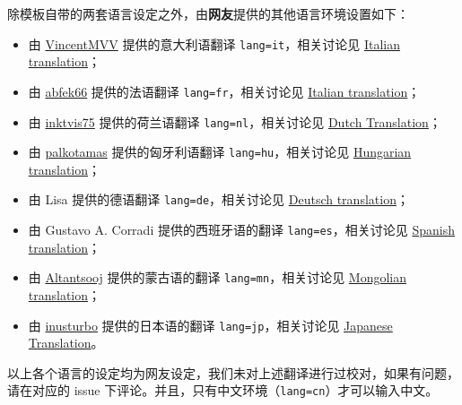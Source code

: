 \documentclass[lang=cn,10pt,cite=super]{elegantbook}
\begin{document}
除模板自带的两套语言设定之外，由\textbf{网友}提供的其他语言环境设置如下：
\begin{itemize}
  \item 由 \href{https://github.com/VincentMVV}{VincentMVV} 提供的意大利语翻译 \lstinline{lang=it}，相关讨论见 \href{https://github.com/ElegantLaTeX/ElegantBook/issues/85}{Italian translation}；
  \item 由 \href{https://github.com/abfek66}{abfek66} 提供的法语翻译 \lstinline{lang=fr}，相关讨论见 \href{https://github.com/ElegantLaTeX/ElegantBook/issues/85}{Italian translation}；
  \item 由 \href{https://github.com/inktvis75}{inktvis75} 提供的荷兰语翻译 \lstinline{lang=nl}，相关讨论见 \href{https://github.com/ElegantLaTeX/ElegantBook/issues/108}{Dutch Translation}；
  \item 由 \href{https://github.com/palkotamas}{palkotamas} 提供的匈牙利语翻译 \lstinline{lang=hu}，相关讨论见 \href{https://github.com/ElegantLaTeX/ElegantBook/issues/111}{Hungarian translation}；
  \item 由 Lisa 提供的德语翻译 \lstinline{lang=de}，相关讨论见 \href{https://github.com/ElegantLaTeX/ElegantBook/issues/113}{Deutsch translation}；
  \item 由 Gustavo A. Corradi 提供的西班牙语的翻译 \lstinline{lang=es}，相关讨论见 \href{https://github.com/ElegantLaTeX/ElegantBook/issues/133}{Spanish translation}；
  \item 由 \href{https://github.com/Altantsooj}{Altantsooj} 提供的蒙古语的翻译 \lstinline{lang=mn}，相关讨论见 \href{https://github.com/ElegantLaTeX/ElegantBook/issues/137}{Mongolian translation}；
  \item 由 \href{https://github.com/inusturbo}{inusturbo} 提供的日本语的翻译 \lstinline{lang=jp}，相关讨论见 \href{https://github.com/ElegantLaTeX/ElegantBook/issues/172}{Japanese Translation}。
\end{itemize}



\begin{remark}
以上各个语言的设定均为网友设定，我们未对上述翻译进行过校对，如果有问题，请在对应的 issue 下评论。并且，只有中文环境（\lstinline{lang=cn}）才可以输入中文。
\end{remark}
\end{document}
